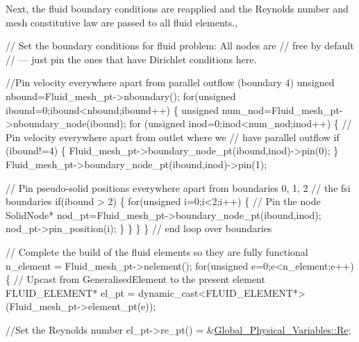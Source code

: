 Next, the fluid boundary conditions are reapplied and the Reynolds number and mesh constitutive law are passed to all fluid elements.,


\begin{DoxyCodeInclude}

   
   \textcolor{comment}{// Set the boundary conditions for fluid problem: All nodes are}
   \textcolor{comment}{// free by default }
   \textcolor{comment}{// --- just pin the ones that have Dirichlet conditions here. }
   
   \textcolor{comment}{//Pin velocity everywhere apart from parallel outflow (boundary 4)}
   \textcolor{keywordtype}{unsigned} nbound=Fluid\_mesh\_pt->nboundary();
   \textcolor{keywordflow}{for}(\textcolor{keywordtype}{unsigned} ibound=0;ibound<nbound;ibound++)
    \{
     \textcolor{keywordtype}{unsigned} num\_nod=Fluid\_mesh\_pt->nboundary\_node(ibound);
     \textcolor{keywordflow}{for} (\textcolor{keywordtype}{unsigned} inod=0;inod<num\_nod;inod++)
      \{
       \textcolor{comment}{// Pin velocity everywhere apart from outlet where we}
       \textcolor{comment}{// have parallel outflow}
       \textcolor{keywordflow}{if} (ibound!=4)
        \{
         Fluid\_mesh\_pt->boundary\_node\_pt(ibound,inod)->pin(0); 
        \}
       Fluid\_mesh\_pt->boundary\_node\_pt(ibound,inod)->pin(1); 
       
       \textcolor{comment}{// Pin pseudo-solid positions everywhere apart from boundaries 0, 1, 2 }
       \textcolor{comment}{// the fsi boundaries}
       \textcolor{keywordflow}{if}(ibound > 2)
        \{
         \textcolor{keywordflow}{for}(\textcolor{keywordtype}{unsigned} i=0;i<2;i++)
          \{
           \textcolor{comment}{// Pin the node}
           SolidNode* nod\_pt=Fluid\_mesh\_pt->boundary\_node\_pt(ibound,inod);
           nod\_pt->pin\_position(i);
          \}
        \}
      \}
    \} \textcolor{comment}{// end loop over boundaries}
   
   
   \textcolor{comment}{// Complete the build of the fluid elements so they are fully functional}
   n\_element = Fluid\_mesh\_pt->nelement();
   \textcolor{keywordflow}{for}(\textcolor{keywordtype}{unsigned} e=0;e<n\_element;e++)
    \{
     \textcolor{comment}{// Upcast from GeneralisedElement to the present element}
     FLUID\_ELEMENT* el\_pt = 
      \textcolor{keyword}{dynamic\_cast<}FLUID\_ELEMENT*\textcolor{keyword}{>}(Fluid\_mesh\_pt->element\_pt(e));
     
     \textcolor{comment}{//Set the Reynolds number}
     el\_pt->re\_pt() = &\hyperlink{namespaceGlobal__Physical__Variables_ab814e627d2eb5bc50318879d19ab16b9}{Global\_Physical\_Variables::Re};
     

\end{DoxyCodeInclude}
